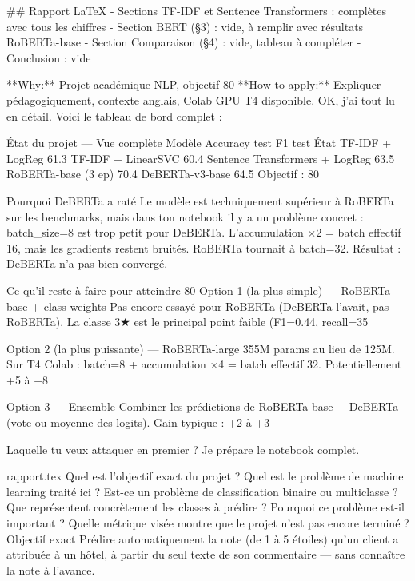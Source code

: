## Rapport LaTeX
- Sections TF-IDF et Sentence Transformers : complètes avec tous les chiffres
- Section BERT (§3) : vide, à remplir avec résultats RoBERTa-base
- Section Comparaison (§4) : vide, tableau à compléter
- Conclusion : vide

**Why:** Projet académique NLP, objectif 80%
**How to apply:** Expliquer pédagogiquement, contexte anglais, Colab GPU T4 disponible.
OK, j'ai tout lu en détail. Voici le tableau de bord complet :

État du projet — Vue complète
Modèle	Accuracy test	F1 test	État
TF-IDF + LogReg	61.3%
TF-IDF + LinearSVC	60.4%
Sentence Transformers + LogReg	63.5%
RoBERTa-base (3 ep)	70.4%
DeBERTa-v3-base	64.5%
Objectif : 80%

Pourquoi DeBERTa a raté
Le modèle est techniquement supérieur à RoBERTa sur les benchmarks, mais dans ton notebook il y a un problème concret : batch_size=8 est trop petit pour DeBERTa. L'accumulation ×2 = batch effectif 16, mais les gradients restent bruités. RoBERTa tournait à batch=32. Résultat : DeBERTa n'a pas bien convergé.

Ce qu'il reste à faire pour atteindre 80%
Option 1 (la plus simple) — RoBERTa-base + class weights
Pas encore essayé pour RoBERTa (DeBERTa l'avait, pas RoBERTa). La classe 3★ est le principal point faible (F1=0.44, recall=35%

Option 2 (la plus puissante) — RoBERTa-large
355M params au lieu de 125M. Sur T4 Colab : batch=8 + accumulation ×4 = batch effectif 32. Potentiellement +5 à +8%

Option 3 — Ensemble
Combiner les prédictions de RoBERTa-base + DeBERTa (vote ou moyenne des logits). Gain typique : +2 à +3%

Laquelle tu veux attaquer en premier ? Je prépare le notebook complet.

rapport.tex
Quel est l’objectif exact du projet ?
Quel est le problème de machine learning traité ici ?
Est-ce un problème de classification binaire ou multiclasse ?
Que représentent concrètement les classes à prédire ?
Pourquoi ce problème est-il important ?
Quelle métrique visée montre que le projet n’est pas encore terminé ?
Objectif exact
Prédire automatiquement la note (de 1 à 5 étoiles) qu'un client a attribuée à un hôtel, à partir du seul texte de son commentaire — sans connaître la note à l'avance.

